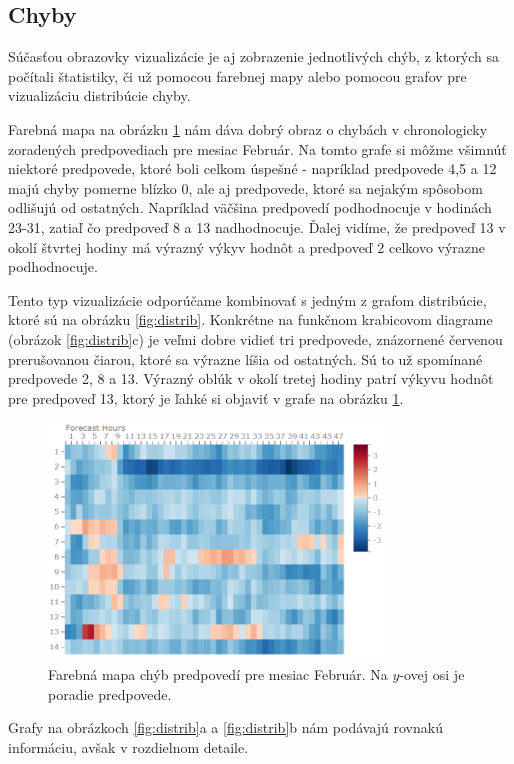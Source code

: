 \subsection{Chyby}

Súčasťou obrazovky vizualizácie je aj zobrazenie jednotlivých chýb, z ktorých sa počítali štatistiky, či už pomocou farebnej mapy alebo pomocou grafov pre vizualizáciu distribúcie chyby.

Farebná mapa na obrázku \ref{fig:errors} nám dáva dobrý obraz o chybách v chronologicky zoradených predpovediach pre mesiac Február. Na tomto grafe si môžme všimnúť niektoré predpovede, ktoré boli celkom úspešné - napríklad predpovede 4,5 a 12 majú chyby pomerne blízko 0, ale aj predpovede, ktoré sa nejakým spôsobom odlišujú od ostatných. Napríklad väčšina predpovedí podhodnocuje v hodinách 23-31, zatiaľ čo predpoveď 8 a 13 nadhodnocuje. Ďalej vidíme, že predpoveď 13 v okolí štvrtej hodiny má výrazný výkyv hodnôt a predpoveď 2 celkovo výrazne podhodnocuje.

Tento typ vizualizácie odporúčame kombinovať s jedným z grafom distribúcie, ktoré sú na obrázku \ref{fig:distrib}. Konkrétne na funkčnom krabicovom diagrame (obrázok \ref{fig:distrib}c) je veľmi dobre vidieť tri predpovede, znázornené červenou prerušovanou čiarou, ktoré sa výrazne líšia od ostatných. Sú to už spomínané predpovede 2, 8 a 13. Výrazný oblúk v okolí tretej hodiny patrí výkyvu hodnôt pre predpoveď 13, ktorý je ľahké si objaviť v grafe na obrázku \ref{fig:errors}.

\begin{figure}
	\centering
	\includegraphics[width = 3.5in]{errors}
	\caption{Farebná mapa chýb predpovedí pre mesiac Február. Na \mbox{$ y $-ovej} osi je poradie predpovede.}
	\label{fig:errors} 
\end{figure}

Grafy na obrázkoch \ref{fig:distrib}a a \ref{fig:distrib}b nám podávajú rovnakú informáciu, avšak v rozdielnom detaile.


